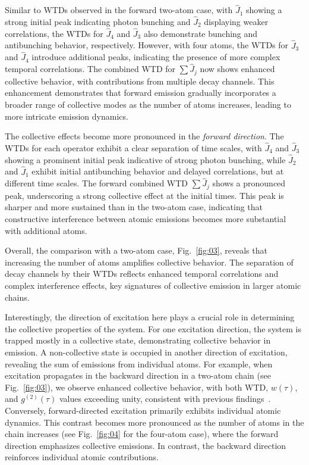 \documentclass[aps,prl,twocolumn,superscriptaddress,showpacs,amsmath,amssymb]{revtex4-2}
\begin{document}
Similar to WTDs observed in the forward two-atom case, with $ \hat{J}_1 $ showing a strong initial peak indicating photon bunching and $ \hat{J}_2 $ displaying weaker correlations, the WTDs for $\hat{J}_4$ and $\hat{J}_3$ also demonstrate bunching and antibunching behavior, respectively. 
However, with four atoms, the WTDs for $ \hat{J}_3 $ and $ \hat{J}_4 $ introduce additional peaks, indicating the presence of more complex temporal correlations. The combined WTD for $ \sum \hat{J}_j $ now shows enhanced collective behavior, with contributions from multiple decay channels. This enhancement demonstrates that forward emission gradually incorporates a broader range of collective modes as the number of atoms increases, leading to more intricate emission dynamics.

The collective effects become more pronounced in the \textit{forward direction}. 
The WTDs for each operator exhibit a clear separation of time scales, with $ \hat{J}_4 $ and $\hat{J}_3$ showing a prominent initial peak indicative of strong photon bunching, while $\hat{J}_2$ and $\hat{J}_1$ exhibit initial antibunching behavior and delayed correlations, but at different time scales. 
The forward combined WTD $ \sum \hat{J}_j $ shows a pronounced peak, underscoring a strong collective effect at the initial times. 
This peak is sharper and more sustained than in the two-atom case, indicating that constructive interference between atomic emissions becomes more substantial with additional atoms.

Overall, the comparison with a two-atom case, Fig.~\ref{fig:03}, reveals that increasing the number of atoms amplifies collective behavior. The separation of decay channels by their WTDs reflects enhanced temporal correlations and complex interference effects, key signatures of collective emission in larger atomic chains.

Interestingly, the direction of excitation here plays a crucial role in determining the collective properties of the system. 
For one excitation direction, the system is trapped mostly in a collective state, demonstrating collective behavior in emission. A non-collective state is occupied in another direction of excitation, revealing the sum of emissions from individual atoms.
For example, when excitation propagates in the backward direction in a two-atom chain (see Fig.~\ref{fig:03}), we observe enhanced collective behavior, with both WTD, $w(\tau)$, and $ g^{(2)}(\tau)$ values exceeding unity, consistent with previous findings~\cite{masson2022universality}. Conversely, forward-directed excitation primarily exhibits individual atomic dynamics. This contrast becomes more pronounced as the number of atoms in the chain increases (see Fig.~\ref{fig:04} for the four-atom case), where the forward direction emphasizes collective emissions. In contrast, the backward direction reinforces individual atomic contributions.
\end{document}
